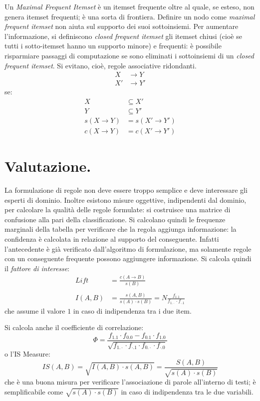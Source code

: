 \documentclass[11pt, a4page, twocolumn]{article}
\begin{document}
Un \textit{Maximal Frequent Itemset} è un itemset frequente oltre al quale, se esteso, non genera itemset frequenti; è una sorta di frontiera.
Definire un nodo come \textit{maximal frequent itemset} non aiuta sul supporto dei suoi sottoinsiemi.
Per aumentare l'informazione, si definiscono \textit{closed frequent itemset} gli itemset chiusi (cioè se tutti i sotto-itemset hanno un supporto minore) e frequenti: è possibile risparmiare passaggi di computazione se sono eliminati i sottoinsiemi di un \textit{closed frequent itemset}.
Si evitano, cioè, regole associative ridondanti.
\begin{align*}
  X &\rightarrow Y \\
  X' &\rightarrow Y'
\end{align*}
se:
\begin{align*}
  X &\subseteq X' \\
  Y &\subseteq Y' \\
  s(X \rightarrow Y) &= s(X' \rightarrow Y') \\
  c(X \rightarrow Y) &= c(X' \rightarrow Y')
\end{align*}


\section{Valutazione.}
La formulazione di regole non deve essere troppo semplice e deve interessare gli esperti di dominio.
Inoltre esistono misure oggettive, indipendenti dal dominio, per calcolare la qualità delle regole formulate: si costruisce una matrice di confusione alla pari della classificazione.
Si calcolano quindi le frequenze marginali della tabella per verificare che la regola aggiunga informazione: la confidenza è calcolata in relazione al supporto del conseguente.
Infatti l'antecedente è già verificato dall'algoritmo di formulazione, ma solamente regole con un conseguente frequente possono aggiungere informazione.
Si calcola quindi il \textit{fattore di interesse}:
\begin{align*}
  Lift &= \frac{c(A \rightarrow B)}{s(B)} \\ \\
  I(A, B) &= \frac{s(A, B)}{s(A) \cdot s(B)} = N \frac{f_{1.1}}{f_{1.\cdot} \cdot f_{\cdot.1}}
\end{align*}
che assume il valore $1$ in caso di indipendenza tra i due item. %

Si calcola anche il coefficiente di correlazione:
\begin{equation*}
  \Phi = \frac{f_{1.1} \cdot f_{0.0} - f_{0.1} \cdot f_{1.0}}{\sqrt{f_{1.\cdot} \cdot f_{\cdot.1} \cdot f_{0.\cdot} \cdot f_{\cdot.0}}}
\end{equation*}
o l'IS Measure:
\begin{equation*}
  IS(A, B) = \sqrt{I(A, B) \cdot s(A, B)} = \frac{S(A, B)}{\sqrt{s(A) \cdot s(B)}}
\end{equation*}
che è una buona misura per verificare l'associazione di parole all'interno di testi; è semplificabile come $\sqrt{s(A) \cdot s(B)}$ in caso di indipendenza tra le due variabili.
\end{document}
